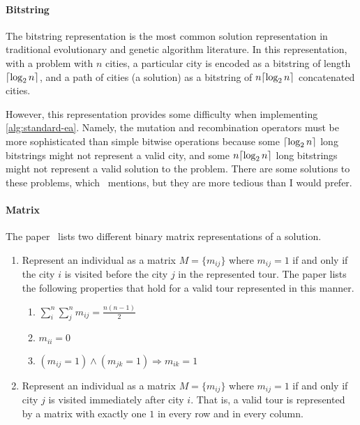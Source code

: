 \documentclass{article}
\begin{document}
\paragraph{Bitstring}
The bitstring representation is the most common solution representation in traditional evolutionary
and genetic algorithm literature. In this representation, with a problem with $n$ cities, a
particular city is encoded as a bitstring of length $\ceil*{\log_2 n}$, and a path of cities (a
solution) as a bitstring of $n\ceil*{\log_2 n}$ concatenated cities.

However, this representation provides some difficulty when implementing \autoref{alg:standard-ea}.
Namely, the mutation and recombination operators must be more sophisticated than simple bitwise
operations because some $\ceil*{\log_2 n}$ long bitstrings might not represent a valid city, and
some $n\ceil*{\log_2 n}$ long bitstrings might not represent a valid solution to the problem. There
are some solutions to these problems, which~\cite{tsp_ea} mentions, but they are more tedious than
I would prefer.

\paragraph{Matrix}
The paper~\cite{tsp_ea} lists two different binary matrix representations of a solution.
\begin{enumerate}
    \item Represent an individual as a matrix $M = \{m_{ij}\}$ where $m_{ij} = 1$ if and only if
          the city $i$ is visited before the city $j$ in the represented tour. The paper lists the
          following properties that hold for a valid tour represented in this manner.
          \begin{enumerate}
              \item $\displaystyle \sum_i^n \sum_j^n m_{ij} = \frac{n(n - 1)}{2}$
              \item $\displaystyle m_{ii} = 0$
              \item $\displaystyle (m_{ij} = 1) \wedge (m_{jk} = 1) \Rightarrow m_{ik} = 1$
          \end{enumerate}
    \item Represent an individual as a matrix $M = \{m_{ij}\}$ where $m_{ij} = 1$ if and only if
          city $j$ is visited immediately after city $i$. That is, a valid tour is represented by a
          matrix with exactly one $1$ in every row and in every column.
\end{enumerate}
\end{document}
